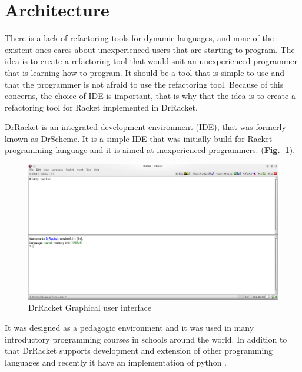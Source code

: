 
% 
% 


\section{Architecture}

There is a lack of refactoring tools for dynamic languages, and none of the existent ones cares about unexperienced users that are starting to program.
The idea is to create a refactoring tool that would suit an unexperienced programmer that is learning how to program. 
It should be a tool that is simple to use and that the programmer is not afraid to use the refactoring tool.
Because of this concerns, the choice of IDE is important, that is why that the idea is to create a refactoring tool for Racket implemented in DrRacket.

DrRacket is an integrated development environment (IDE), that was formerly known as DrScheme. It is a simple IDE that was initially build for Racket programming language and it is aimed at inexperienced programmers. ({\bf Fig.~\ref{fig:DrRacketGui}}).
\begin{figure}[tbhp]
	\centering
	\includegraphics[width=1\textwidth]{img/DrRacketGui.png}
	\caption{DrRacket Graphical user interface}
	\label{fig:DrRacketGui}
\end{figure}
It was designed as a pedagogic environment \cite{drscheme_pegadogy} and it was used in many introductory programming courses in schools around the world. In addition to that DrRacket supports development and extension of other programming languages \cite{tobin2011languages} and recently it have an implementation of python \cite{ramos2014implementation}.



